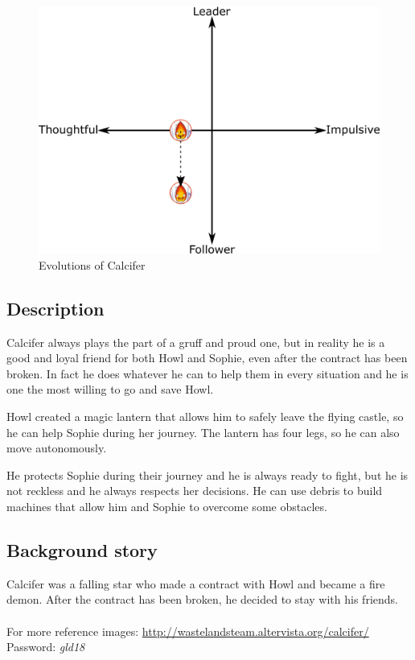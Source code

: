 \begin{figure}[H]
  \centering
   \includegraphics[width=14cm]{Images/Diagrams/Evolutions/calciferEvolution}
  \caption{Evolutions of Calcifer}
\end{figure}

\subsection{Description}
Calcifer always plays the part of a gruff and proud one, but in reality he is a good and loyal friend for both Howl and Sophie, even after the contract has been broken. In fact he does whatever he can to help them in every situation and he is one the most willing to go and save Howl.

Howl created a magic lantern that allows him to safely leave the flying castle, so he can help Sophie during her journey. The lantern has four legs, so he can also move autonomously.

He protects Sophie during their journey and he is always ready to fight, but he is not reckless and he always respects her decisions. He can use debris to build machines that allow him and Sophie to overcome some obstacles.

\subsection{Background story}
Calcifer was a falling star who made a contract with Howl and became a fire demon. After the contract has been broken, he decided to stay with his friends.
\\\\
For more reference images: \url{http://wastelandsteam.altervista.org/calcifer/}\\
Password: \textit{gld18}

